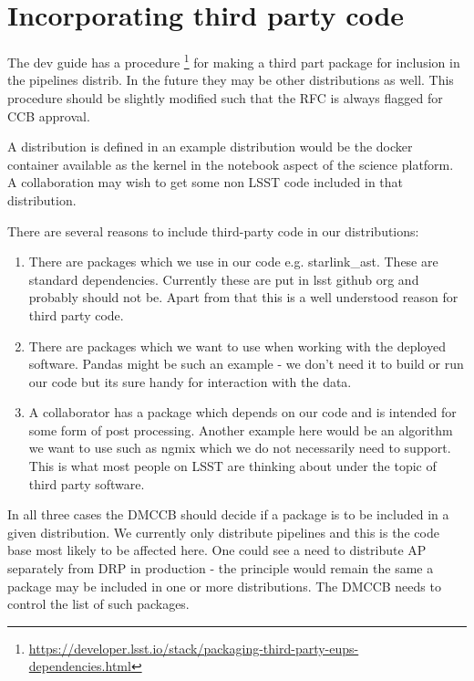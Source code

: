 \section{Incorporating third party code } \label{sec:party3}

The dev guide has a procedure \footnote{\url{https://developer.lsst.io/stack/packaging-third-party-eups-dependencies.html}}
for making a third part package for inclusion in the pipelines distrib. In the future they may be other distributions as well.
This procedure should be slightly modified such that the RFC is always flagged for CCB approval.

A distribution is defined in  an example distribution would be the docker container available as the kernel in the notebook aspect of the science platform. A collaboration may wish to get some  non LSST code included in that distribution.

There are several reasons to include third-party code in our distributions:
\begin{enumerate}
\item There are packages which we use in our code e.g. starlink\_ast.  These are standard dependencies.  Currently these are put in lsst github org and probably should not be. Apart from that this is a well understood reason for third party code. \label{item:depend}
\item There are packages which we want to use when working with the deployed software. Pandas  might be such an example - we don't need it to build or run our code but its sure handy for interaction with the data.\label{item:want}
\item A collaborator has a package which depends on our code and is intended for some form of post processing. Another example here would be an algorithm we want to use such as ngmix which we do not necessarily need to support. This is what most people on LSST are thinking about under the topic of third party software. \label{item:colab}
\end{enumerate}


In all three cases the DMCCB should decide if a package is to be included in a given distribution. We currently only distribute pipelines and this is the code base most likely to be affected here. One could see a need to distribute AP separately from DRP in production - the principle would remain the same a package may be included in one or more distributions. The DMCCB needs to control the list of such packages.

